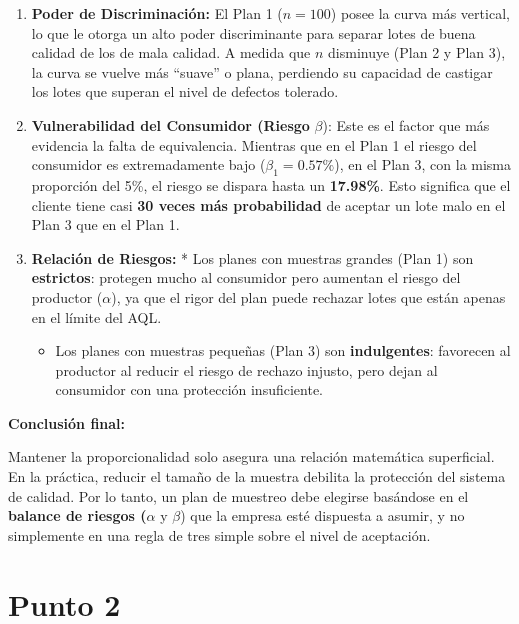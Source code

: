\documentclass[
  12pt,
]{article}
\providecommand{\tightlist}{%
  \setlength{\itemsep}{0pt}\setlength{\parskip}{0pt}}
\begin{document}
\begin{enumerate}
\def\labelenumi{\arabic{enumi}.}
\item
  \textbf{Poder de Discriminación:} El Plan 1 (\(n=100\)) posee la curva
  más vertical, lo que le otorga un alto poder discriminante para
  separar lotes de buena calidad de los de mala calidad. A medida que
  \(n\) disminuye (Plan 2 y Plan 3), la curva se vuelve más ``suave'' o
  plana, perdiendo su capacidad de castigar los lotes que superan el
  nivel de defectos tolerado.
\item
  \textbf{Vulnerabilidad del Consumidor (Riesgo} \(\beta\)): Este es el
  factor que más evidencia la falta de equivalencia. Mientras que en el
  Plan 1 el riesgo del consumidor es extremadamente bajo
  (\(\beta_1 = 0.57\%\)), en el Plan 3, con la misma proporción del 5\%,
  el riesgo se dispara hasta un \textbf{17.98\%}. Esto significa que el
  cliente tiene casi \textbf{30 veces más probabilidad} de aceptar un
  lote malo en el Plan 3 que en el Plan 1.
\item
  \textbf{Relación de Riesgos:} * Los planes con muestras grandes (Plan
  1) son \textbf{estrictos}: protegen mucho al consumidor pero aumentan
  el riesgo del productor (\(\alpha\)), ya que el rigor del plan puede
  rechazar lotes que están apenas en el límite del AQL.

  \begin{itemize}
  \tightlist
  \item
    Los planes con muestras pequeñas (Plan 3) son \textbf{indulgentes}:
    favorecen al productor al reducir el riesgo de rechazo injusto, pero
    dejan al consumidor con una protección insuficiente.
  \end{itemize}
\end{enumerate}

\textbf{Conclusión final:}

Mantener la proporcionalidad solo asegura una relación matemática
superficial. En la práctica, reducir el tamaño de la muestra debilita la
protección del sistema de calidad. Por lo tanto, un plan de muestreo
debe elegirse basándose en el \textbf{balance de riesgos (}\(\alpha\) y
\(\beta\)) que la empresa esté dispuesta a asumir, y no simplemente en
una regla de tres simple sobre el nivel de aceptación.

\section{Punto 2}\label{punto-2}
\end{document}
